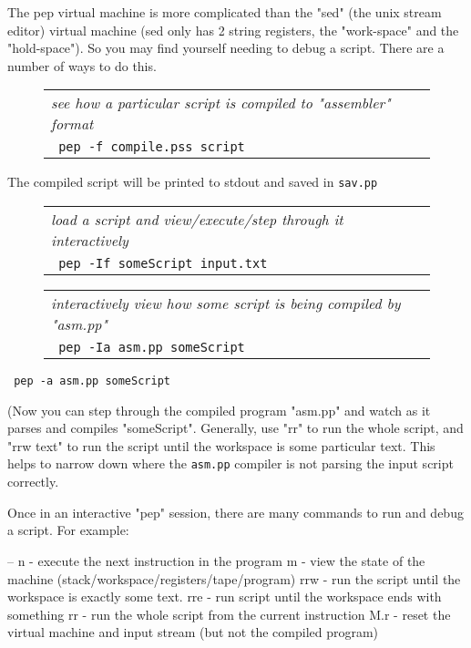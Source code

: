 \documentclass[a4paper,12pt]{article}
\begin{document}
  The pep virtual machine is more complicated than the "sed" (the unix stream
  editor) virtual machine (sed only has 2 string registers, the
  "work-space" and the "hold-space"). So you may find yourself needing to
  debug a script. There are a number of ways to do this.
 \begin{figure}
 \begin{tabular}{ l }
 \emph{ see how a particular script is compiled to "assembler" format } \\ 
 \verb| pep -f compile.pss script |
 \end{tabular} 
 \end{figure}

  The compiled script will be printed to stdout and saved in \texttt{sav.pp}
 \begin{figure}
 \begin{tabular}{ l }
 \emph{ load a script and view/execute/step through it interactively  } \\ 
 \verb| pep -If someScript input.txt |
 \end{tabular} 
 \end{figure}
 \begin{figure}
 \begin{tabular}{ l }
 \emph{ interactively view how some script is being compiled by "asm.pp"  } \\ 
 \verb| pep -Ia asm.pp someScript  |
 \end{tabular} 
 \end{figure} 
 \verb| pep -a asm.pp someScript  |


  (Now you can step through the compiled program "asm.pp" and watch as
  it parses and compiles "someScript". Generally, use "rr" to run the
  whole script, and "rrw text" to run the script until the workspace
  is some particular text. This helps to narrow down where the \texttt{asm.pp}
  compiler is not parsing the input script correctly.

  Once in an interactive "pep" session, there are many commands to
  run and debug a script. For example:

     --
    n - execute the next instruction in the program
    m - view the state of the machine (stack/workspace/registers/tape/program)
    rrw - run the script until the workspace is exactly some text.
    rre - run script until the workspace ends with something
    rr - run the whole script from the current instruction
    M.r - reset the virtual machine and input stream
          (but not the compiled program)
\end{document}
